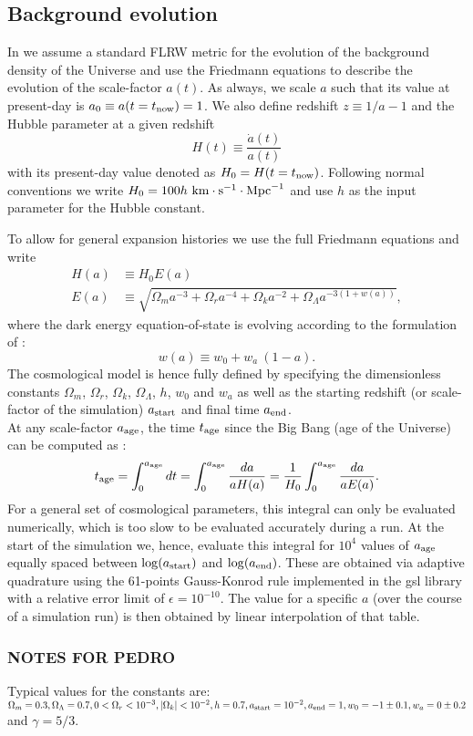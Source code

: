 \subsection{Background evolution}
\label{ssec:flrw}

In \swift we assume a standard FLRW metric for the evolution of the
background density of the Universe and use the Friedmann equations to
describe the evolution of the scale-factor $a(t)$.  As always, we
scale $a$ such that its value at present-day is $a_0 \equiv a(t=t_{\rm
  now}) = 1$. We also define redshift $z \equiv 1/a - 1$ and the
Hubble parameter at a given redshift
\begin{equation}
H(t) \equiv \frac{\dot{a}(t)}{a(t)}
\end{equation}
with its present-day value denoted as $H_0 = H(t=t_{\rm
  now})$. Following normal conventions we write $H_0 = 100
h~\rm{km}\cdot\rm{s}^{-1}\cdot\rm{Mpc}^{-1}$ and use $h$ as the input
parameter for the Hubble constant.

To allow for general expansion histories we use the full Friedmann
equations and write
\begin{align}
H(a) &\equiv H_0 E(a) \\ E(a) &\equiv\sqrt{\Omega_m a^{-3} + \Omega_r
  a^{-4} + \Omega_k a^{-2} + \Omega_\Lambda a^{-3(1+w(a))}},
\label{eq:friedmann}
\end{align}
where the dark energy equation-of-state is evolving according to the
formulation of \cite{Linder2003}:
\begin{equation}
w(a) \equiv w_0 + w_a~(1-a).
\end{equation}
The cosmological model is hence fully defined by specifying the
dimensionless constants $\Omega_m$, $\Omega_r$, $\Omega_k$,
$\Omega_\Lambda$, $h$, $w_0$ and $w_a$ as well as the starting
redshift (or scale-factor of the simulation) $a_{\rm start}$ and final
time $a_{\rm end}$. \\ At any scale-factor $a_{\rm age}$, the time
$t_{\rm age}$ since the Big Bang (age of the Universe) can be computed
as \citep[e.g.][]{Wright2006}:
\begin{equation}
  t_{\rm age} = \int_{0}^{a_{\rm age}} dt = \int_{0}^{a_{\rm age}}
  \frac{da}{a H(a)} = \frac{1}{H_0} \int_{0}^{a_{\rm age}}
  \frac{da}{a E(a)}.
\end{equation}
For a general set of cosmological parameters, this integral can only
be evaluated numerically, which is too slow to be evaluated accurately
during a run. At the start of the simulation we, hence, evaluate this
integral for $10^4$ values of $a_{\rm age}$ equally spaced between
$\log(a_{\rm start})$ and $\log(a_{\rm end})$. These are obtained via
adaptive quadrature using the 61-points Gauss-Konrod rule implemented
in the {\sc gsl} library \citep{GSL} with a relative error limit of
$\epsilon=10^{-10}$. The value for a specific $a$ (over the course of
a simulation run) is then obtained by linear interpolation of that
table.

\subsubsection{NOTES FOR PEDRO}

Typical values for the constants are: $\Omega_m = 0.3,
\Omega_\Lambda=0.7, 0 < \Omega_r<10^{-3}, |\Omega_k | < 10^{-2},
h=0.7, a_{\rm start} = 10^{-2}, a_{\rm end} = 1, w_0 = -1\pm 0.1,
w_a=0\pm0.2$ and $\gamma = 5/3$.
